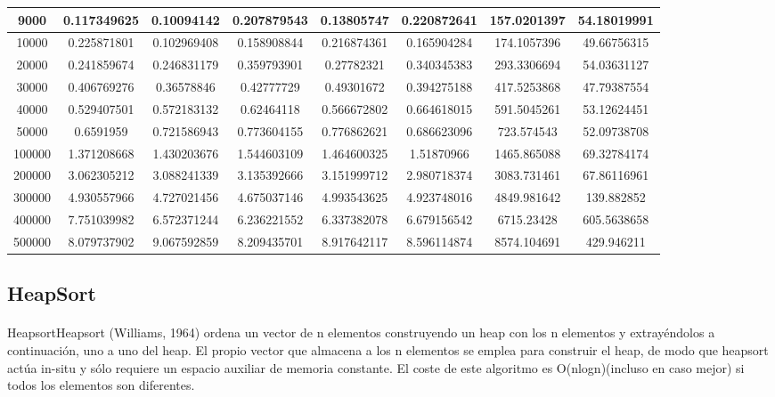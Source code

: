 \documentclass{article}
\begin{document}
\begin{table}[]
\begin{tabular}{|c|c|c|c|c|c|c|c| }
9000	&0.117349625	&0.10094142	&0.207879543	&0.13805747	&0.220872641	&157.0201397	&54.18019991\\ \hline
10000	&0.225871801	&0.102969408	&0.158908844	&0.216874361	&0.165904284	&174.1057396	&49.66756315\\ \hline
20000	&0.241859674	&0.246831179	&0.359793901	&0.27782321	&0.340345383	&293.3306694	&54.03631127\\ \hline
30000	&0.406769276	&0.36578846	&0.42777729	&0.49301672	&0.394275188	&417.5253868	&47.79387554\\ \hline
40000	&0.529407501	&0.572183132	&0.62464118	&0.566672802	&0.664618015	&591.5045261	&53.12624451\\ \hline
50000	&0.6591959	&0.721586943	&0.773604155	&0.776862621	&0.686623096	&723.574543	&52.09738708\\ \hline
100000	&1.371208668	&1.430203676	&1.544603109	&1.464600325	&1.51870966	&1465.865088	&69.32784174\\ \hline
200000	&3.062305212	&3.088241339	&3.135392666	&3.151999712	&2.980718374	&3083.731461	&67.86116961\\ \hline
300000	&4.930557966	&4.727021456	&4.675037146	&4.993543625	&4.923748016	&4849.981642	&139.882852\\ \hline
400000	&7.751039982	&6.572371244	&6.236221552	&6.337382078	&6.679156542	&6715.23428	&605.5638658\\ \hline
500000	&8.079737902	&9.067592859	&8.209435701	&8.917642117	&8.596114874	&8574.104691	&429.946211\\ \hline

             \end{tabular}
    \end{table}

    \subsection{HeapSort}
        \paragraph {}
        HeapsortHeapsort (Williams, 1964) ordena un vector de n elementos construyendo un heap con los n elementos y extrayéndolos a continuación, uno a uno del heap. El propio vector que almacena a los n elementos se emplea para construir el heap, de modo que heapsort actúa in-situ y sólo requiere un espacio auxiliar de memoria constante. El coste de este algoritmo es O(nlogn)(incluso en caso mejor) si todos los elementos son diferentes.
\end{document}
